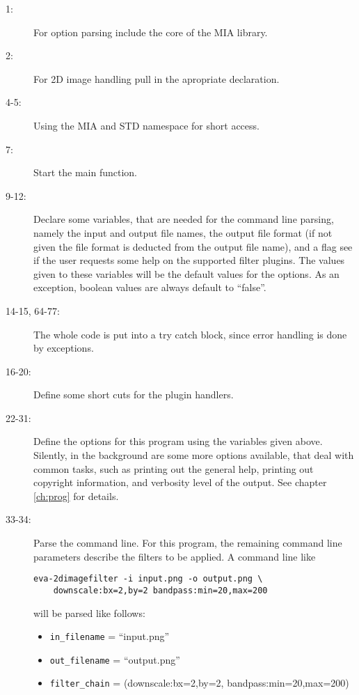 \documentclass[english, 10pt, a4paper,headsepline,openany]{scrbook}
\begin{document}
\begin{description}
\item [1:] For option parsing include the core of the MIA library. 
\item [2:] For 2D image handling pull in the apropriate declaration. 
\item [4-5:] Using the MIA and STD namespace for short access. 
\item [7:] Start the main function. 
\item [9-12:] Declare some variables, that are needed for the command line parsing, namely the input and output file names, 
    the output file format (if not given the file format is deducted from the output file name), and a flag 
    see if the user requests some help on the supported filter plugins. 
    The values given to these variables will be the default values for the options. 
     As an exception, boolean values are always default to ``false''. 
\item [14-15, 64-77:] The whole code is put into a try catch block, since error handling is done by exceptions. 
\item [16-20:] Define some short cuts for the plugin handlers.
\item [22-31:] Define the options for this program using the variables given above. 
    Silently, in the background are some more options available, that deal with common tasks, such as printing out the general
      help, printing out copyright information, and verbosity level of the output. 
    See chapter \ref{ch:prog} for details. 
\item [33-34:] Parse the command line. 
     For this program, the remaining command line parameters describe the filters to be applied. 
    A command line like 
    \lstset{language=bash,numbers=none}
    \begin{lstlisting}
eva-2dimagefilter -i input.png -o output.png \
    downscale:bx=2,by=2 bandpass:min=20,max=200
    \end{lstlisting}
      will be parsed like follows:
      \begin{itemize}
      \item  \texttt{in\_filename} = ``input.png''
      \item  \texttt{out\_filename} = ``output.png''
      \item  \texttt{filter\_chain} = (downscale:bx=2,by=2, bandpass:min=20,max=200)
      \end{itemize}


\end{description}
\end{document}
